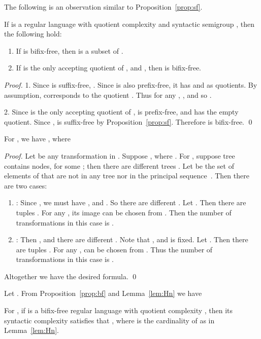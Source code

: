\documentclass{llncs}
\newcommand{\be}{\begin{enumerate}}
\newcommand{\ee}{\end{enumerate}}
\begin{document}
The following is an observation similar to Proposition~\ref{prop:sf}.

\begin{proposition}\label{prop:bf}
If  is a regular language with quotient complexity  and syntactic semigroup , then the following hold: 
\be
\item If  is bifix-free, then  is a subset of . 
\item If  is the only accepting quotient of , and , then  is bifix-free.
\ee
\end{proposition}

\begin{proof}\mbox{}
1. Since  is suffix-free,  . Since  is also prefix-free,  it has  and  as quotients. By assumption,  corresponds to the quotient . Thus for any , , and so . 

2. Since  is the only accepting quotient of ,  is prefix-free, and  has the empty quotient. Since ,   is suffix-free by Proposition~\ref{prop:sf}. Therefore  is bifix-free. \qed
\end{proof}

\begin{lemma}\label{lem:Hn} 
For , we have , where 

\end{lemma}

\begin{proof} 
Let  be any transformation in . Suppose , where . For , suppose tree  contains  nodes, for some ; then there are  different trees . Let  be the set of elements of  that are not in any tree  nor in the principal sequence~. Then there are two cases: 

\be 

\item : Since , we must have , and . So there are  different . Let . Then there are  tuples . For any , its image  can be chosen from . Then the number of transformations  in this case is . 

\item : Then , and there are  different . Note that , and  is fixed. Let . Then there are  tuples . For any ,  can be chosen from . Thus the number of transformations  in this case is . 

\ee

Altogether we have the desired formula. \qed
\end{proof}

Let . From Proposition~\ref{prop:bf} and Lemma~\ref{lem:Hn} we have 
\begin{proposition}\label{prop:Hncard} 
For , if  is a bifix-free regular language with quotient complexity , then its syntactic complexity  satisfies that , where  is the cardinality of  as in Lemma~\ref{lem:Hn}.
\end{proposition}
\end{document}
